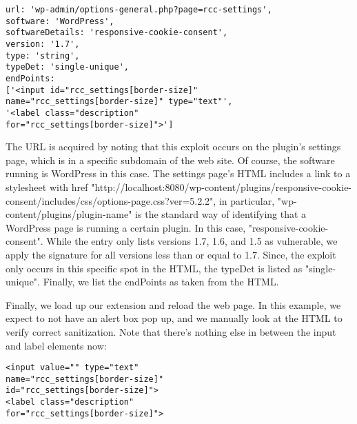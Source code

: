  \lstset{basicstyle=\small}
\begin{lstlisting}
url: 'wp-admin/options-general.php?page=rcc-settings',
software: 'WordPress',
softwareDetails: 'responsive-cookie-consent',
version: '1.7',
type: 'string',
typeDet: 'single-unique',
endPoints: 
['<input id="rcc_settings[border-size]" 
name="rcc_settings[border-size]" type="text"',
'<label class="description" 
for="rcc_settings[border-size]">']
\end{lstlisting}

The URL is acquired by noting that this exploit occurs on the plugin's settings page, which is in a specific subdomain of the web site. Of course, the software running is WordPress in this case. The settings page's HTML includes a link to a stylesheet with href "http://localhost:8080/wp-content/plugins/responsive-cookie-consent/includes/css/options-page.css?ver=5.2.2", in particular, "wp-content/plugins/plugin-name" is the standard way of identifying that a WordPress page is running a certain plugin. In this case, "responsive-cookie-consent". While the entry only lists versions 1.7, 1.6, and 1.5 as vulnerable, we apply the signature for all versions less than or equal to 1.7.
Since, the exploit only occurs in this specific spot in the HTML, the typeDet is listed as "single-unique". Finally, we list the endPoints as taken from the HTML.

Finally, we load up our extension and reload the web page. In this example, we expect to not have an alert box pop up, and we manually look at the HTML to verify correct sanitization. Note that there's nothing else in between the input and label elements now:

\begin{lstlisting}
<input value="" type="text" 
name="rcc_settings[border-size]" 
id="rcc_settings[border-size]">
<label class="description"
for="rcc_settings[border-size]">
\end{lstlisting}


